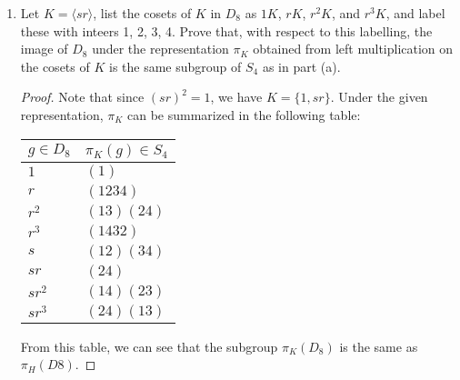 \begin{enumerate}
\begin{proof}
      $\pi_H$ and $\pi_H'$:
      \begin{align*}
        \pi_H'(g) &= (23)\pi_H(g)(23)^{-1} \\
                  &= (23)\pi_H(g)(23).
      \end{align*}
      Hence from the above table for $\pi_H$ we obtain the following
      table for $\pi_H'$:
      \begin{center}
        \begin{tabular}{|l|l|}
          \hline
          $g\in D_8$ & $\pi_H'(g)\in S_4$ \\
          \hline\hline
          $1$     & $(1)$ \\
          $r$     & $(1324)$ \\
          $r^2$   & $(12)(34)$ \\
          $r^3$   & $(1423)$ \\
          $s$     & $(34)$ \\
          $sr$    & $(14)(23)$ \\
          $sr^2$  & $(12)$ \\
          $sr^3$  & $(13)(24)$ \\
          \hline
        \end{tabular}
      \end{center}
    The subgroup $\pi_H'$ is different from $\pi_H$ since
    $(12)\in Im(\pi_H')$ but $(12)\not\in Im(\pi_H)$.
    \end{proof}
  \item Let $K=\langle sr\rangle$, list the cosets of $K$ in $D_8$ as $1K$,
    $rK$, $r^2K$, and $r^3K$, and label these with inteers 1, 2, 3, 4.
    Prove that, with respect to this labelling, the image of $D_8$ under
    the representation $\pi_K$ obtained from left multiplication on the
    cosets of $K$ is the same subgroup of $S_4$ as in part (a).
    \begin{proof}
      Note that since $(sr)^2=1$, we have $K=\{1,sr\}$. Under the given
      representation, $\pi_K$ can be summarized in the following table:
      \begin{center}
        \begin{tabular}{|l|l|}
          \hline
          $g\in D_8$ & $\pi_K(g)\in S_4$ \\
          \hline\hline
          $1$     & $(1)$ \\
          $r$     & $(1234)$ \\
          $r^2$   & $(13)(24)$ \\
          $r^3$   & $(1432)$ \\
          $s$     & $(12)(34)$ \\
          $sr$    & $(24)$ \\
          $sr^2$  & $(14)(23)$ \\
          $sr^3$  & $(24)(13)$ \\
          \hline
        \end{tabular}
      \end{center}
      From this table, we can see that the subgroup $\pi_K(D_8)$ is the
      same as $\pi_H(D8)$.
    \end{proof}
\end{enumerate}
